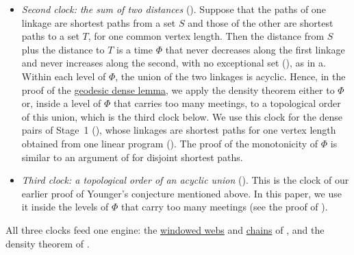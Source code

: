 \documentclass[fontsize=12pt,leading=14pt]{fullpaper}
\newcommand{\Qcal}{\mathcal{Q}}
\newcommand{\Rcal}{\mathcal{R}}
\newcounter{step}
\begin{document}
\begin{itemize}
    Since no arc leaves a cut, no strong component of the residual digraph contains a copy of the tail and a copy of the head, and so one of the cuts of the chain also separates these copies.
    Hence, the vertices of one time on a path of $\Rcal$ meet at most one path of $\Qcal$, and no single time carries many meetings (see the proof of ).
    We use this clock in the dense step of Stage~1 (), and in Stage~2 both for the approximate cuts that bound the slab and for the dense case inside the slab ().
    For the approximate cuts, the base path takes the place of $\Qcal$.
  \item \emph{Second clock: the sum of two distances} ().
    Suppose that the paths of one linkage are shortest paths from a set $S$ and those of the other are shortest paths to a set $T$, for one common vertex length.
    Then the distance from $S$ plus the distance to $T$ is a time $\Phi$ that never decreases along the first linkage and never increases along the second, with no exceptional set (), as in a.
    Within each level of $\Phi$, the union of the two linkages is acyclic.
    Hence, in the proof of the \hyperref[thm:gdl]{geodesic dense lemma}, we apply the density theorem either to $\Phi$ or, inside a level of $\Phi$ that carries too many meetings, to a topological order of this union, which is the third clock below.
    We use this clock for the dense pairs of Stage~1 (), whose linkages are shortest paths for one vertex length obtained from one linear program ().
    The proof of the monotonicity of $\Phi$ is similar to an argument of \textcite[Lemma~7]{BercziK17} for disjoint shortest paths.
  \item \emph{Third clock: a topological order of an acyclic union} ().
    This is the clock of our earlier proof of Younger's conjecture mentioned above.
    In this paper, we use it inside the levels of $\Phi$ that carry too many meetings (see the proof of ).
\end{itemize}
All three clocks feed one engine: the \hyperref[def:windowed]{windowed webs} and \hyperref[def:chain]{chains} of , and the density theorem of .
\end{document}
